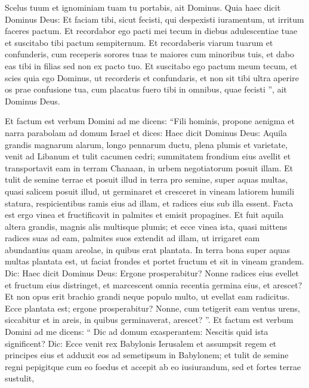 \begin{biblechapter}
\begin{biblechapter}
\begin{biblechapter}
\begin{biblechapter}
\begin{biblechapter}
\begin{biblechapter}
\begin{biblechapter}
\begin{biblechapter}
\begin{biblechapter}
\begin{biblechapter}
\begin{biblechapter}
\begin{biblechapter}
\begin{biblechapter}
\begin{biblechapter}
\begin{biblechapter}
\begin{biblechapter}
\verse Scelus tuum et ignominiam tuam tu portabis, ait Dominus.
 \verse Quia haec dicit Dominus Deus: Et faciam tibi, sicut fecisti, qui despexisti iuramentum, ut irritum faceres pactum.
 \verse Et recordabor ego pacti mei tecum in diebus adulescentiae tuae et suscitabo tibi pactum sempiternum. 
\verse Et recordaberis viarum tuarum et confunderis, cum receperis sorores tuas te maiores cum minoribus tuis, et dabo eas tibi in filias sed non ex pacto tuo. 
\verse Et suscitabo ego pactum meum tecum, et scies quia ego Dominus, 
\verse ut recorderis et confundaris, et non sit tibi ultra aperire os prae confusione tua, cum placatus fuero tibi in omnibus, quae fecisti ”, ait Dominus Deus.
 
\begin{biblechapter}
\verse Et factum est verbum Domini ad me dicens: 
\verse “Fili hominis, propone aenigma et narra parabolam ad domum Israel 
\verse et dices:
 Haec dicit Dominus Deus:
 Aquila grandis
 magnarum alarum,
 longo pennarum ductu,
 plena plumis et varietate,
 venit ad Libanum
 et tulit cacumen cedri;
 \verse summitatem frondium eius avellit
 et transportavit eam in terram Chanaan,
 in urbem negotiatorum posuit illam.
 \verse Et tulit de semine terrae
 et posuit illud in terra pro semine,
 super aquas multas,
 quasi salicem posuit illud,
 \verse ut germinaret et cresceret in vineam latiorem
 humili statura,
 respicientibus ramis eius ad illam,
 et radices eius sub illa essent.
 Facta est ergo vinea
 et fructificavit in palmites
 et emisit propagines.
 \verse Et fuit aquila altera grandis,
 magnis alis
 multisque plumis;
 et ecce vinea ista,
 quasi mittens radices suas ad eam,
 palmites suos extendit ad illam,
 ut irrigaret eam abundantius
 quam areolae, in quibus erat plantata.
 \verse In terra bona
 super aquas multas
 plantata est,
 ut faciat frondes
 et portet fructum
 et sit in vineam grandem.
 \verse Dic: Haec dicit Dominus Deus:
 Ergone prosperabitur?
 Nonne radices eius evellet
 et fructum eius distringet,
 et marcescent omnia recentia germina eius, et arescet?
 Et non opus erit brachio grandi neque populo multo,
 ut evellat eam radicitus.
 \verse Ecce plantata est; ergone prosperabitur?
 Nonne, cum tetigerit eam ventus urens,
 siccabitur
 et in areis, in quibus germinaverat, arescet? ”.
 \verse Et factum est verbum Domini ad me dicens: 
\verse “ Dic ad domum exasperantem: Nescitis quid ista significent? Dic: Ecce venit rex Babylonis Ierusalem et assumpsit regem et principes eius et adduxit eos ad semetipsum in Babylonem; 
 \verse et tulit de semine regni pepigitque cum eo foedus et accepit ab eo iusiurandum, sed et fortes terrae sustulit, 

\end{biblechapter}
\end{biblechapter}
\end{biblechapter}
\end{biblechapter}
\end{biblechapter}
\end{biblechapter}
\end{biblechapter}
\end{biblechapter}
\end{biblechapter}
\end{biblechapter}
\end{biblechapter}
\end{biblechapter}
\end{biblechapter}
\end{biblechapter}
\end{biblechapter}
\end{biblechapter}
\end{biblechapter}
